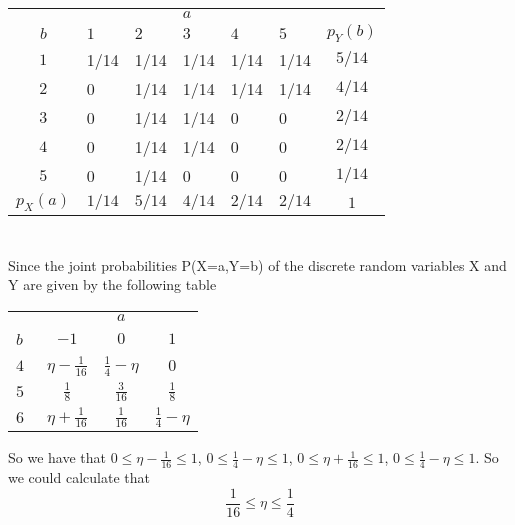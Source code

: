 \documentclass[10.5pt]{article}
\begin{document}
\begin{center}
    \begin{tabular}{clllll|c}
    \hline
    \hline
     & & & $a$ & & & \\
     \cline{2-6}
    $b$ & $1$ & $2$ & $3$ & $4$ & $5$ & $p_Y(b)$ \\
    \hline
    $1$ & 1/14 & 1/14 & 1/14 & 1/14 & 1/14 & $5/14$ \\
     \cline{7-7}
    $2$ & 0 & 1/14 & 1/14 & 1/14 & 1/14 & $4/14$ \\
     \cline{7-7}
    $3$ & 0 & 1/14 & 1/14 & 0 & 0 & $2/14$ \\
     \cline{7-7}
    $4$ & 0 & 1/14 & 1/14 & 0 & 0 & $2/14$ \\ 
     \cline{7-7}
    $5$ & 0 & 1/14 & 0 & 0 & 0 & $1/14$ \\
    \hline
    $p_X(a)$ & $1/14$ & $5/14$  & $4/14$  & $2/14$   &  $2/14$ & $1$ \\
    \hline
    \hline
    \end{tabular}
\end{center}

\section{}
\subsection{}
Since the joint probabilities P(X=a,Y=b) of the discrete random variables X and Y are given by the following table
\begin{center}
    \begin{tabular}{l ccc}
    \hline
    \hline
     & & $a$ &  \\
     \cline{2-4}
    $b$\ \quad\qquad & $-1$ & $0$ & $1$ \\
    \hline
    $4$ & $\eta-\frac{1}{16}$ & $\frac{1}{4}-\eta$ & $0$ \\
    \hline
    $5$ & $\frac{1}{8}$ & $\frac{3}{16}$  & $\frac{1}{8}$  \\
    \hline
    $6$ & $\eta+\frac{1}{16}$ &  $\frac{1}{16}$ & $\frac{1}{4}-\eta$  \\
    \hline
    \hline
    \end{tabular}
\end{center}

So we have that $0\leqslant \eta -\frac{1}{16} \leqslant 1$, $0\leqslant \frac{1}{4}-\eta \leqslant 1$, $0\leqslant \eta +\frac{1}{16} \leqslant 1$, $0\leqslant \frac{1}{4}-\eta \leqslant 1$. So we could calculate that $$\frac{1}{16} \leqslant \eta \leqslant \frac{1}{4}$$
\end{document}

